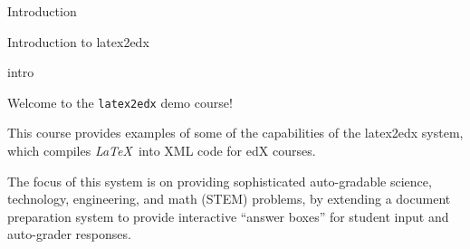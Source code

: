 
\begin{edXchapter}{Introduction}

\begin{edXsection}{Introduction to latex2edx}

\begin{edXvertical}

\begin{edXtext}{intro}

Welcome to the \texttt{latex2edx} demo course!

This course provides examples of some of the capabilities of the
latex2edx system, which compiles \textit{\LaTeX}\ into XML code for edX courses.

The focus of this system is on providing sophisticated auto-gradable
science, technology, engineering, and math (STEM) problems, by
extending a document preparation system to provide interactive
``answer boxes'' for student input and auto-grader responses.

\end{edXtext}

\end{edXvertical}

\end{edXsection}

\end{edXchapter}
